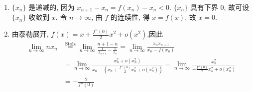\begin{solution}
    \begin{enumerate}
        \item $\{x_n\}$ 是递减的, 因为 $x_{n+1} - x_n = f(x_n) - x_n < 0$. $\{x_n\}$ 具有下界 $0$, 故可设 $\{x_n\}$ 收敛到 $x$. 令 $n \to \infty$, 由 $f$ 的连续性, 得 $x = f(x)$, 故 $x = 0$.
        \item 由泰勒展开, $f(x) = x + \frac{f''(0)}{2}x^2 + o(x^2)$,因此
              \begin{align*}
                  \lim_{n \to \infty} n x_n & \stackrel{\text{Stolz}}{=} \lim_{n \to \infty} \frac{n+1 - n}{\frac{1}{x_{n+1}} - \frac{1}{x_n}}
                  = \lim_{n \to \infty} \frac{x_n x_{n+1}}{x_n - f(x_n)}                                                                               \\
                                            & = \lim_{n \to \infty} \frac{x_n^2 + o(x_n^2)}{x_n - \left(x_n + \frac{f''(0)}{2}x_n^2 + o(x_n^2)\right)}
                  = \lim_{n \to \infty} \frac{x_n^2}{- \frac{f''(0)}{2}x_n^2 + o(x_n^2)}                                                               \\
                                            & = - \frac{2}{f''(0)}
              \end{align*}
    \end{enumerate}
\end{solution}

\newpage